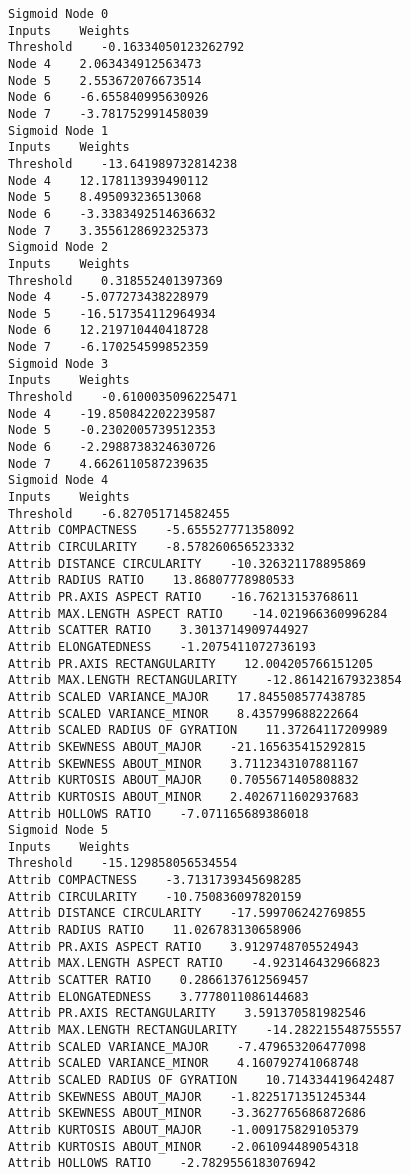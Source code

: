 \documentclass[
	article,			%
	11pt,				%
	oneside,			%
	a4paper,			%
	english,			%
	brazil,				%
	sumario=tradicional
	]{abntex2}
\begin{document}
\begin{lstlisting}
Sigmoid Node 0
Inputs    Weights
Threshold    -0.16334050123262792
Node 4    2.063434912563473
Node 5    2.553672076673514
Node 6    -6.655840995630926
Node 7    -3.781752991458039
Sigmoid Node 1
Inputs    Weights
Threshold    -13.641989732814238
Node 4    12.178113939490112
Node 5    8.495093236513068
Node 6    -3.3383492514636632
Node 7    3.3556128692325373
Sigmoid Node 2
Inputs    Weights
Threshold    0.318552401397369
Node 4    -5.077273438228979
Node 5    -16.517354112964934
Node 6    12.219710440418728
Node 7    -6.170254599852359
Sigmoid Node 3
Inputs    Weights
Threshold    -0.6100035096225471
Node 4    -19.850842202239587
Node 5    -0.2302005739512353
Node 6    -2.2988738324630726
Node 7    4.6626110587239635
Sigmoid Node 4
Inputs    Weights
Threshold    -6.827051714582455
Attrib COMPACTNESS    -5.655527771358092
Attrib CIRCULARITY    -8.578260656523332
Attrib DISTANCE CIRCULARITY    -10.326321178895869
Attrib RADIUS RATIO    13.86807778980533
Attrib PR.AXIS ASPECT RATIO    -16.76213153768611
Attrib MAX.LENGTH ASPECT RATIO    -14.021966360996284
Attrib SCATTER RATIO    3.3013714909744927
Attrib ELONGATEDNESS    -1.2075411072736193
Attrib PR.AXIS RECTANGULARITY    12.004205766151205
Attrib MAX.LENGTH RECTANGULARITY    -12.861421679323854
Attrib SCALED VARIANCE_MAJOR    17.845508577438785
Attrib SCALED VARIANCE_MINOR    8.435799688222664
Attrib SCALED RADIUS OF GYRATION    11.37264117209989
Attrib SKEWNESS ABOUT_MAJOR    -21.165635415292815
Attrib SKEWNESS ABOUT_MINOR    3.7112343107881167
Attrib KURTOSIS ABOUT_MAJOR    0.7055671405808832
Attrib KURTOSIS ABOUT_MINOR    2.4026711602937683
Attrib HOLLOWS RATIO    -7.071165689386018
Sigmoid Node 5
Inputs    Weights
Threshold    -15.129858056534554
Attrib COMPACTNESS    -3.7131739345698285
Attrib CIRCULARITY    -10.750836097820159
Attrib DISTANCE CIRCULARITY    -17.599706242769855
Attrib RADIUS RATIO    11.026783130658906
Attrib PR.AXIS ASPECT RATIO    3.9129748705524943
Attrib MAX.LENGTH ASPECT RATIO    -4.923146432966823
Attrib SCATTER RATIO    0.2866137612569457
Attrib ELONGATEDNESS    3.7778011086144683
Attrib PR.AXIS RECTANGULARITY    3.591370581982546
Attrib MAX.LENGTH RECTANGULARITY    -14.282215548755557
Attrib SCALED VARIANCE_MAJOR    -7.479653206477098
Attrib SCALED VARIANCE_MINOR    4.160792741068748
Attrib SCALED RADIUS OF GYRATION    10.714334419642487
Attrib SKEWNESS ABOUT_MAJOR    -1.8225171351245344
Attrib SKEWNESS ABOUT_MINOR    -3.3627765686872686
Attrib KURTOSIS ABOUT_MAJOR    -1.009175829105379
Attrib KURTOSIS ABOUT_MINOR    -2.061094489054318
Attrib HOLLOWS RATIO    -2.7829556183076942

\end{lstlisting}
\end{document}
